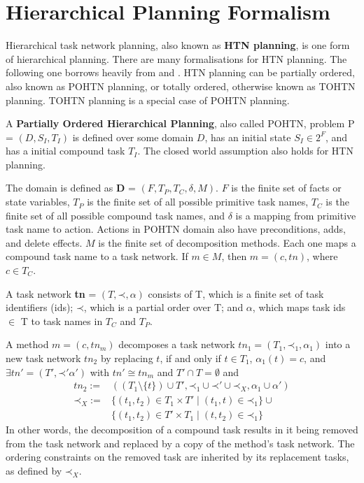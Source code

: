 \documentclass[letterpaper]{article} %
\newcommand{\singlePrec} {\ensuremath{\mathit{ \mathord{\prec} }}}
\begin{document}
 


\section{Hierarchical Planning Formalism}
Hierarchical task network planning, also known as \textbf{HTN planning}, is one form of hierarchical planning. There are many formalisations for HTN planning. The following one borrows heavily from \cite{HTNSurvey} and \cite{Geier2011TIHTNDecidability}. HTN planning can be partially ordered, also known as POHTN planning, or totally ordered, otherwise known as TOHTN planning. TOHTN planning is a special case of POHTN planning.  %

A \textbf{Partially Ordered Hierarchical Planning}, also called POHTN, problem P = $(D, S_I, T_I)$
is defined over some domain $D$, 
has an initial state $S_I \in 2^F$, and 
has a initial compound task $T_I$. 
The closed world assumption also holds for HTN planning.

The domain is defined as \textbf{D} = $(F, T_P, T_C, \delta, M)$.
$F$ is the finite set of facts or state variables, $T_P$ is the finite set of all possible primitive task names, $T_C$ is the finite set of all possible compound task names, and
$\delta$ is a mapping from primitive task name to action. Actions in POHTN domain also have preconditions, adds, and delete effects.
$M$ is the finite set of decomposition methods. Each one maps a compound task name to a task network. If $m \in M$, then $m=(c, tn)$, where $c \in T_C$.

A task network \textbf{tn} = $(T, \singlePrec, \alpha)$ consists of
T, which is a finite set of task identifiers (ids); 
$\singlePrec$, which is a partial order over T; and
$\alpha$, which maps task ids $\in$ T to task names in $T_C$ and $T_P$. 

A method $m = (c, tn_m)$ decomposes a task network $tn_1 = (T_1, \singlePrec_1, \alpha_1)$ into
a new task network $tn_2$ by replacing $t$, if and only if $t \in T_1$, $\alpha_1(t) = c$, and $\exists tn' = (T', \singlePrec' \alpha')$ with $tn' \cong tn_m$ and $T' \cap T = \emptyset$ and
\begin{align}
tn_2 :=     &((T_1 \setminus \{t\}) \cup T',    \singlePrec_1 \cup \singlePrec' \cup \singlePrec_X,        \alpha_1 \cup \alpha') \\
\singlePrec_X :=  &\{(t_1, t_2) \in T_1 \times T'  \mid  (t_1,t) \in \singlePrec_1 \} \cup \\
&\{(t_1, t_2) \in T' \times T_1 \mid (t, t_2) \in \singlePrec_1 \}  
\end{align}
In other words, the decomposition of a compound task results in it being removed from the task network and replaced by a copy of the method’s task network. The ordering constraints
on the removed task are inherited by its replacement tasks, as defined by $\singlePrec_X$. 
\end{document}
